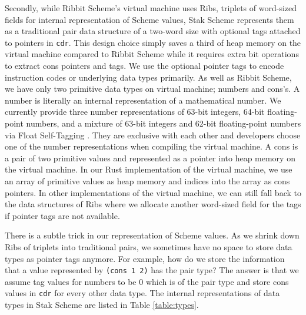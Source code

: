 \documentclass[sigplan, anonymous, review]{acmart}
\begin{document}
Secondly, while Ribbit Scheme's virtual machine uses Ribs, triplets of
word-sized fields for internal representation of Scheme values, Stak
Scheme represents them as a traditional pair data structure of a
two-word size with optional tags attached to pointers in \texttt{cdr}.
This design choice simply saves a third of heap memory on the virtual machine
compared to Ribbit Scheme while it requires extra bit operations to
extract cons pointers and tags.
We use the optional pointer tags to encode instruction
codes or underlying data types primarily.
As well as Ribbit Scheme, we have only two primitive data types on virtual
machine; numbers and cons's.
A number is literally an internal representation of a mathematical number.
We currently provide three number
representations of 63-bit integers, 64-bit floating-point numbers,
and a mixture of 63-bit integers and 62-bit floating-point numbers
via Float Self-Tagging \cite{floatselftag}.
They are exclusive with each other and developers choose one
of the number representations when compiling the virtual machine.
A cons is a pair of two primitive values and represented as
a pointer into heap memory on the virtual machine.
In our Rust implementation of the virtual machine, we use an array of
primitive values as heap memory and indices into the array as cons
pointers.
In other implementations of the virtual machine, we can still fall
back to the data structures of Ribs where we allocate another
word-sized field for the tags if pointer tags are not available.

There is a subtle trick in our representation of Scheme values.
As we shrink down Ribs of triplets into traditional pairs, we sometimes
have no space to store data types as pointer tags anymore.
For example, how do we store the information that a value represented
by \texttt{(cons 1 2)} has the pair type?
The answer is that we assume tag values for numbers to be 0 which is of
the pair type
and store cons values in \texttt{cdr} for every other data type.
The internal representations of data types in Stak Scheme are listed
in Table \ref{table:types}.
\end{document}
